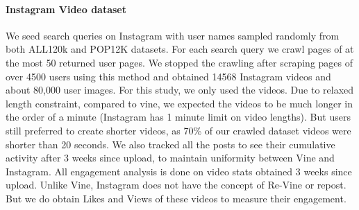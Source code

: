 \paragraph{Instagram Video dataset} We seed search queries on Instagram with user names sampled randomly from both ALL120k and POP12K datasets. For each search query we crawl pages of at the most 50 returned user pages. We stopped the crawling after scraping pages of over 4500 users using this method and obtained 14568 Instagram videos and about 80,000 user images. For this study, we only used the videos. Due to relaxed length constraint, compared to vine, we expected the videos to be much longer in the order of a minute (Instagram has 1 minute limit on video lengths). But users still preferred to create shorter videos, as 70\% of our crawled dataset videos were shorter than 20 seconds.  We also tracked all the posts to see their cumulative activity after 3 weeks since upload, to maintain uniformity between Vine and Instagram. All engagement analysis is done on video stats obtained 3 weeks since upload. Unlike Vine, Instagram does not have the concept of Re-Vine or repost. But we do obtain Likes and Views of these videos to measure their engagement.


%



%
% 

